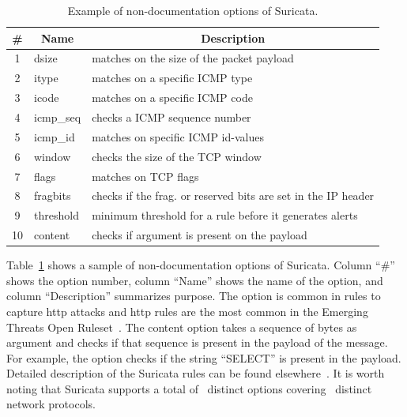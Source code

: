 \documentclass[sigconf,review, anonymous]{acmart}
\begin{document}
\vspace{-1ex}
\begin{table}[t!]
  \footnotesize
  \caption{\label{table:rules}Example of non-documentation options of Suricata.}
  \vspace{-2ex}
  \centering
  \begin{tabular}{clp{6cm}}
    \toprule
    \multicolumn{1}{c}{\#} & \multicolumn{1}{c}{Name} &  \multicolumn{1}{c}{Description}\\
    \midrule     
    1 & dsize & matches on the size of the packet payload\\
    2 & itype &  matches on a specific ICMP type\\
    3 & icode & matches on a specific ICMP code\\
    4 & icmp\_seq  & checks a ICMP sequence number\\
    5 & icmp\_id & matches on specific ICMP id-values\\
    6 & window & checks the size of the TCP window\\
    7 & flags & matches on TCP flags\\
    8 & fragbits & checks if the frag. or reserved bits are set in the IP header\\
    9 & threshold & minimum threshold for a rule before it generates alerts\\
    10 & content & checks if argument is present on the payload\\
    \bottomrule
  \end{tabular}
  \vspace{-3ex}  
\end{table}

Table~\ref{table:rules} shows a sample of non-documentation options of
Suricata. Column ``\#'' shows the option number, column ``Name'' shows
the name of the option, and column ``Description'' summarizes
purpose. The option  is common in rules to capture
http attacks and http rules are the most common in the Emerging
Threats Open Ruleset~\cite{emerging-threats-open}. The content option
takes a sequence of bytes as argument and checks if that sequence is
present in the payload of the message.  For example, the option
 checks if the string ``SELECT'' is present
in the payload.  Detailed description of the Suricata rules can be
found elsewhere~\cite{suri-rule-format}. It is worth noting that
Suricata supports a total of \totoptions\ distinct options covering
\numproto\ distinct network protocols.
\end{document}

